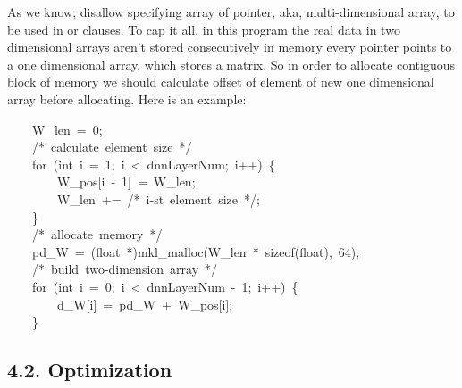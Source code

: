 \documentclass{article}
\begin{document}
\noindent{}As we know,  disallow specifying array of pointer, aka, multi-dimensional array, to be used in  or  clauses. To cap it all, in this  program the real data in two dimensional arrays aren't stored consecutively in memory \textendash{} every pointer points to a one dimensional array, which stores a matrix. So in order to allocate contiguous block of memory we should calculate offset of element of new one dimensional array before allocating. Here is an example:%
\begin{mdpre}%
\noindent~~~~{W\_len}~=~{0};\\
~~~~{/*}{~calculate~element~size~}{*/}\\
~~~~{for}~({int}~i~=~{1};~i~\textless{}~dnnLayerNum;~i++)~\{\\
~~~~~~~~{W\_pos}[i~-~{1}]~=~{W\_len};\\
~~~~~~~~{W\_len}~+=~{/*}{~i-st~element~size~}{*/};\\
~~~~\}\\
~~~~{/*}{~allocate~memory~}{*/}\\
~~~~pd\_W~=~({float}~*)mkl\_malloc({W\_len}~*~sizeof({float}),~{64});\\
~~~~{/*}{~build~two-dimension~array~}{*/}\\
~~~~{for}~({int}~i~=~{0};~i~\textless{}~dnnLayerNum~-~{1};~i++)~\{\\
~~~~~~~~d\_W[i]~=~pd\_W~+~{W\_pos}[i];\\
~~~~\}\\
\end{mdpre}
\subsection{4.2.\hspace*{0.5em} Optimization}\label{sec-openmp-optimization}%
\end{document}
